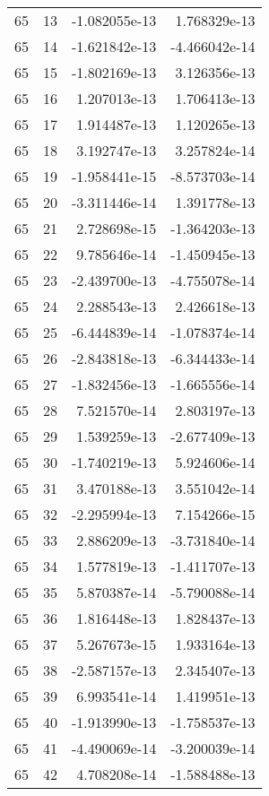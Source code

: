 \begin{tabular}{rrrr}
  65 &   13 & -1.082055e-13 &  1.768329e-13 \\
  65 &   14 & -1.621842e-13 & -4.466042e-14 \\
  65 &   15 & -1.802169e-13 &  3.126356e-13 \\
  65 &   16 &  1.207013e-13 &  1.706413e-13 \\
  65 &   17 &  1.914487e-13 &  1.120265e-13 \\
  65 &   18 &  3.192747e-13 &  3.257824e-14 \\
  65 &   19 & -1.958441e-15 & -8.573703e-14 \\
  65 &   20 & -3.311446e-14 &  1.391778e-13 \\
  65 &   21 &  2.728698e-15 & -1.364203e-13 \\
  65 &   22 &  9.785646e-14 & -1.450945e-13 \\
  65 &   23 & -2.439700e-13 & -4.755078e-14 \\
  65 &   24 &  2.288543e-13 &  2.426618e-13 \\
  65 &   25 & -6.444839e-14 & -1.078374e-14 \\
  65 &   26 & -2.843818e-13 & -6.344433e-14 \\
  65 &   27 & -1.832456e-13 & -1.665556e-14 \\
  65 &   28 &  7.521570e-14 &  2.803197e-13 \\
  65 &   29 &  1.539259e-13 & -2.677409e-13 \\
  65 &   30 & -1.740219e-13 &  5.924606e-14 \\
  65 &   31 &  3.470188e-13 &  3.551042e-14 \\
  65 &   32 & -2.295994e-13 &  7.154266e-15 \\
  65 &   33 &  2.886209e-13 & -3.731840e-14 \\
  65 &   34 &  1.577819e-13 & -1.411707e-13 \\
  65 &   35 &  5.870387e-14 & -5.790088e-14 \\
  65 &   36 &  1.816448e-13 &  1.828437e-13 \\
  65 &   37 &  5.267673e-15 &  1.933164e-13 \\
  65 &   38 & -2.587157e-13 &  2.345407e-13 \\
  65 &   39 &  6.993541e-14 &  1.419951e-13 \\
  65 &   40 & -1.913990e-13 & -1.758537e-13 \\
  65 &   41 & -4.490069e-14 & -3.200039e-14 \\
  65 &   42 &  4.708208e-14 & -1.588488e-13 \\

\end{tabular}
